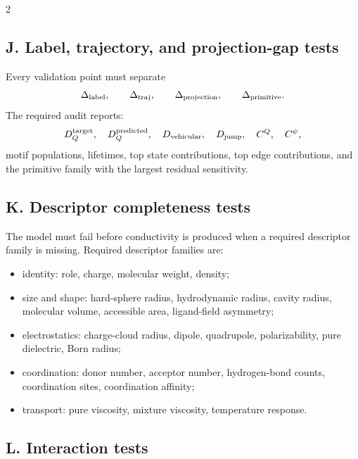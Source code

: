 \documentclass[10pt]{article}
\begin{document}
\begin{multicols}{2}
\subsection{J. Label, trajectory, and projection-gap tests}

Every validation point must separate
\[
\Delta_{\rm label},\qquad
\Delta_{\rm traj},\qquad
\Delta_{\rm projection},\qquad
\Delta_{\rm primitive}.
\]
The required audit reports:
\[
D_Q^{\rm target},\quad
D_Q^{\rm predicted},\quad
D_{\rm vehicular},\quad
D_{\rm jump},\quad
C^Q,\quad
C^\psi,
\]
motif populations, lifetimes, top state contributions, top edge contributions,
and the primitive family with the largest residual sensitivity.

\subsection{K. Descriptor completeness tests}

The model must fail before conductivity is produced when a required descriptor
family is missing. Required descriptor families are:
\begin{itemize}
\item identity: role, charge, molecular weight, density;
\item size and shape: hard-sphere radius, hydrodynamic radius, cavity radius,
molecular volume, accessible area, ligand-field asymmetry;
\item electrostatics: charge-cloud radius, dipole, quadrupole, polarizability,
pure dielectric, Born radius;
\item coordination: donor number, acceptor number, hydrogen-bond counts,
coordination sites, coordination affinity;
\item transport: pure viscosity, mixture viscosity, temperature response.
\end{itemize}

\subsection{L. Interaction tests}


\end{multicols}
\end{document}
